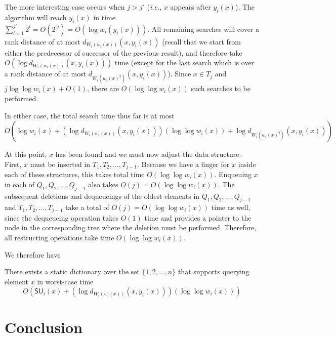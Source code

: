 \documentclass{llncs}
\newcommand{\ie}{\textsl{i.e.}}
\newcommand{\BigOh}[1]{O\!\left(#1\right)}
\newcommand{\SU}[1]{\textsf{SU}_i\!\left(#1\right)}
\begin{document}
The more interesting case occurs when $j > j'$ (\ie, $x$ appears after $y_i(x)$). The algorithm will reach $y_i(x)$ in time $\sum_{l=1}^{j'} 2^l = \BigOh{2^{'j}} = \BigOh{\log w_i(y_i(x))}$. All remaining searches will cover a rank distance of at most $d_{W_i(w_i(x))}(x,y_i(x))$ (recall that we start from either the predecessor of successor of the previous result), and therefore take $\BigOh{\log d_{W_i(w_i(x))}(x,y_i(x))}$ time (except for the last search which is over a rank distance of at most $d_{W_i(w_i(x)^2)}(x,y_i(x))$). Since $x \in T_j$ and $j \log \log w_i(x) + \BigOh{1}$, there are $\BigOh{\log \log w_i(x)}$ such searches to be performed.

In either case, the total search time thus far is at most 
\begin{displaymath}
	\BigOh{\log w_i(x) + (\log d_{W_i(w_i(x))}(x,y_i(x)))(\log \log w_i(x)) + \log d_{W_i(w_i(x)^2)}(x,y_i(x))}
\end{displaymath}

At this point, $x$ has been found and we must now adjust the data structure. First, $x$ must be inserted in $T_1,T_2,\ldots,T_{j-1}$. Because we have a finger for $x$ inside each of these structures, this takes total time $\BigOh{\log \log w_i(x)}$. Enqueuing $x$ in each of $Q_1,Q_2,\ldots,Q_{j-1}$ also takes $\BigOh{j} = \BigOh{\log \log w_i(x)}$. The subsequent deletions and dequeueings of the oldest elements in $Q_1,Q_2,\ldots,Q_{j-1}$ and $T_1,T_2,\ldots,T_{j-1}$ take a total of $\BigOh{j} = \BigOh{\log \log w_i(x)}$ time as well, since the dequeueing operation takes $\BigOh{1}$ time and provides a pointer to the node in the corresponding tree where the deletion must be performed. Therefore, all restructing operations take time $\BigOh{\log \log w_i(x)}$.

We therefore have

\begin{theorem}
\label{theorem:main}
There exists a static dictionary over the set $\{1,2,\ldots,n\}$ that supports querying element $x$ in worst-case time
\begin{displaymath}
\BigOh{\SU{x} + (\log d_{W_i(w_i(x))}(x,y_i(x)))(\log \log w_i(x))}
\end{displaymath}
\end{theorem}
	
\section{Conclusion}
\label{section:conclusion}
\end{document}

